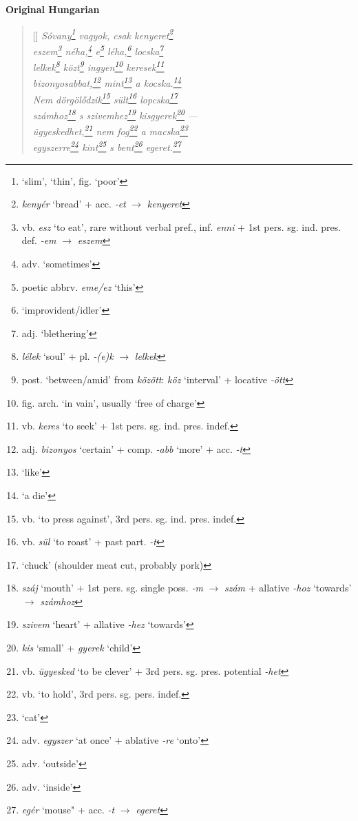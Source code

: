 \documentclass[a4paper,12pt,twoside,final]{book}
\begin{document}
\newpage


\noindent \textbf{Original Hungarian}


\settowidth{\versewidth}{számhoz s szivemhez kisgyerek ---}

\begin{verse}[\versewidth]
  \it
  Sóvany\footnote{`slim', `thin', fig. `poor'} vagyok, csak
  kenyeret\footnote{\emph{kenyér} `bread' + acc. \emph{-et}
  $\rightarrow$ \emph{kenyeret}} \\
  eszem\footnote{vb. \emph{esz} `to eat', rare without verbal
  pref., inf. \emph{enni} + 1st pers. sg. ind. pres. def. \emph{-em}
  $\rightarrow$ \emph{eszem}} néha,\footnote{adv. `sometimes'} e\footnote{poetic
  abbrv. \emph{eme/ez} `this'} léha,\footnote{`improvident/idler'}
  locska\footnote{adj. `blethering'} \\
  lelkek\footnote{\emph{lélek} `soul' +
  pl. \emph{-(e)k} $\rightarrow$ \emph{lelkek}}
  közt\footnote{post. `between/amid' from \emph{között}: \emph{köz}
  `interval' + locative \emph{-ött}} ingyen\footnote{fig. arch. `in
  vain', usually `free of charge'} keresek\footnote{vb.
  \emph{keres} `to seek' + 1st pers. sg. ind. pres. indef.} \\
  bizonyosabbat,\footnote{adj. \emph{bizonyos} `certain' +
  comp. \emph{-abb} `more' + acc. \emph{-t}} mint\footnote{`like'} a
  kocska.\footnote{`a die'} \\
  Nem dörgölődzik\footnote{vb. `to press against', 3rd
  pers. sg. ind. pres. indef.} sült\footnote{vb. \emph{sül} `to
  roast'  + past part. \emph{-t}} lopcska\footnote{`chuck'
  (shoulder meat cut, probably pork)} \\
  számhoz\footnote{\emph{száj} `mouth' + 1st
  pers. sg. single poss. \emph{-m} $\rightarrow$ \emph{szám} +
  allative \emph{-hoz} `towards' $\rightarrow$ \emph{számhoz}} s
  szivemhez\footnote{\emph{szivem} `heart' +
  allative \emph{-hez} `towards'} kisgyerek\footnote{\emph{kis} `small' +
  \emph{gyerek} `child'} --- \\
  ügyeskedhet,\footnote{vb. \emph{ügyesked} `to be clever' +
  3rd pers. sg. pres. potential \emph{-het}} nem fog\footnote{vb.
  `to hold', 3rd pers. sg. pers. indef.} a macska\footnote{`cat'} \\
  egyszerre\footnote{adv. \emph{egyszer} `at once' +
  ablative \emph{-re} `onto'} kint\footnote{adv. `outside'} s
  bent\footnote{adv. `inside'} egeret.\footnote{\emph{egér}
  `mouse" + acc. \emph{-t} $\rightarrow$ \emph{egeret}} \\
\end{verse}
\end{document}
